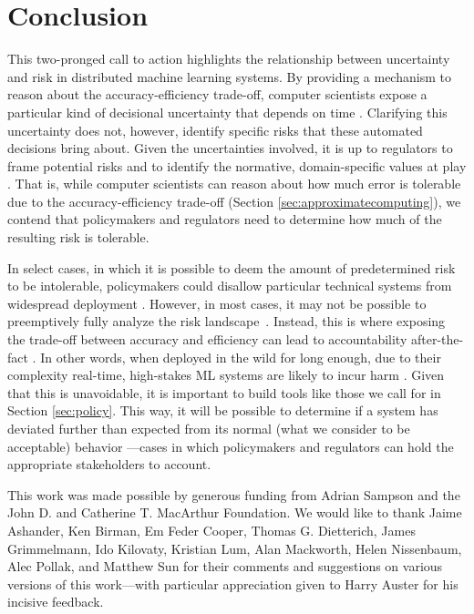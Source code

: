 \documentclass[sigplan,screen]{acmart}
\begin{document}
\section{Conclusion} \label{conclusion}
This two-pronged call to action highlights the relationship between uncertainty and risk in distributed machine learning systems. By providing a mechanism to reason about the accuracy-efficiency trade-off, computer scientists expose a particular kind of decisional uncertainty that depends on time \cite{horvitz1987constraints, boddy1994deliberation}. Clarifying this uncertainty does not, however, identify specific risks that these automated decisions bring about. Given the uncertainties involved, it is up to regulators to frame potential risks and to identify the normative, domain-specific values at play \cite{jasanoff2016ethics}. That is, while computer scientists can reason about how much error is tolerable due to the accuracy-efficiency trade-off (Section \ref{sec:approximatecomputing}), we contend that policymakers and regulators need to determine how much of the resulting risk is tolerable. 

In select cases, in which it is possible to deem the amount of predetermined risk to be intolerable, policymakers could disallow particular technical systems from widespread deployment \cite{sachs2011precaution, Dietterich2018robustAI, perrow1999risk}. However, in most cases, it may not be possible to preemptively fully analyze the risk landscape~\cite{sunstein2003precaution, smith2015opportunism}. Instead, this is where exposing the trade-off between accuracy and efficiency can lead to accountability after-the-fact \cite{backes2009csar, Haeberlen2007peerreview, Lampson2004security}. In other words, when deployed in the wild for long enough, due to their complexity real-time, high-stakes ML systems are likely to incur harm \cite{perrow1999risk, vaughan1996challenger, Nissenbaum1996accountability}. Given that this is unavoidable, it is important to build tools like those we call for in Section \ref{sec:policy}. This way, it will be possible to determine if a system has deviated further than expected from its normal (what we consider to be acceptable) behavior \cite{sampson2015thesis}---cases in which policymakers and regulators can hold the appropriate stakeholders to account.

\begin{acks}
This work was made possible by generous funding from Adrian Sampson and the John D. and Catherine T. MacArthur Foundation. We would like to thank Jaime Ashander, Ken Birman, Em Feder Cooper, Thomas G. Dietterich, James Grimmelmann, Ido Kilovaty, Kristian Lum, Alan Mackworth, Helen Nissenbaum, Alec Pollak, and Matthew Sun for their comments and suggestions on various versions of this work---with particular appreciation given to Harry Auster for his incisive feedback.
\end{acks}
\end{document}
